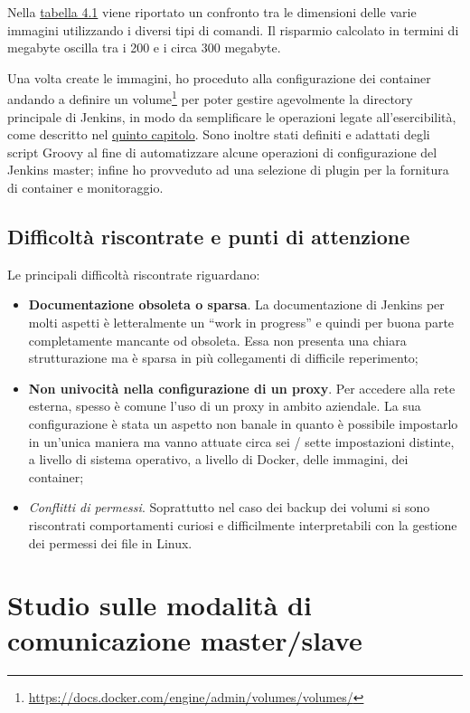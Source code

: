   

Nella \hyperref[tab:dim]{tabella 4.1} viene riportato un confronto tra le dimensioni delle varie immagini utilizzando i diversi tipi di comandi. Il risparmio calcolato in termini di megabyte oscilla tra i 200 e i circa 300 megabyte.



Una volta create le immagini, ho proceduto alla configurazione dei \gls{container} andando a definire un volume\footnote{\url{https://docs.docker.com/engine/admin/volumes/volumes/}} per poter gestire agevolmente la directory principale di Jenkins, in modo da semplificare le operazioni legate all'esercibilità, come descritto nel \hyperref[cap:esercibilità]{quinto capitolo}. Sono inoltre stati definiti e adattati degli script Groovy al fine di automatizzare alcune operazioni di configurazione del Jenkins \gls{master}; infine ho provveduto ad una selezione di \gls{plugin} per la fornitura di \gls{container} e monitoraggio. 

\subsection{Difficoltà riscontrate e punti di attenzione}

Le principali difficoltà riscontrate riguardano:

\begin{itemize}
    \item \textbf{Documentazione obsoleta o sparsa}. La documentazione di Jenkins per molti aspetti è letteralmente un ``work in progress'' e quindi per buona parte completamente mancante od obsoleta. Essa non presenta una chiara strutturazione ma è sparsa in più collegamenti di difficile reperimento;
    \item \textbf{Non univocità nella configurazione di un proxy}. Per accedere alla rete esterna, spesso è comune l'uso di un proxy in ambito aziendale. La sua configurazione è stata un aspetto non banale in quanto è possibile impostarlo in un'unica maniera ma vanno attuate circa sei / sette impostazioni distinte, a livello di sistema operativo, a livello di Docker, delle immagini, dei container;
    \item \textit{Conflitti di permessi}. Soprattutto nel caso dei backup dei volumi si sono riscontrati comportamenti curiosi e difficilmente interpretabili con la gestione dei permessi dei file in \gls{Linux}. 
\end{itemize}

\section{Studio sulle modalità di comunicazione master/slave}
